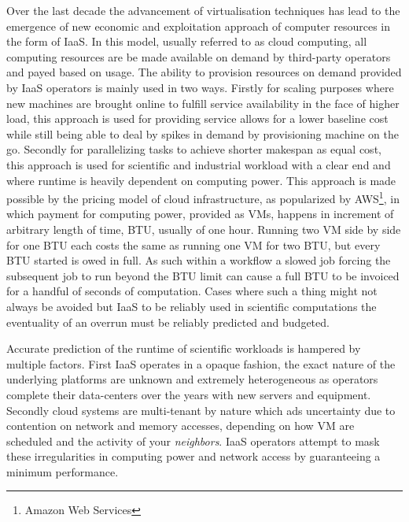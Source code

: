 \documentclass[10pt,conference,compsocconf]{IEEEtran}
\begin{document}
Over the last decade the advancement of virtualisation techniques has lead to the emergence of new economic and exploitation approach of computer resources in the form of \ac{IaaS}. In this model, usually referred to as cloud computing, all computing resources are be made available on demand by third-party operators and payed based on usage. The ability to provision resources on demand provided by \ac{IaaS} operators is mainly used in two ways. Firstly for scaling purposes where new machines are brought online to fulfill service availability in the face of higher load, this approach is used for providing service allows for a lower baseline cost while still being able to deal by spikes in demand by provisioning machine on the go. Secondly for parallelizing tasks to achieve shorter makespan as equal cost, this approach is used for scientific and industrial workload with a clear end and where runtime is heavily dependent on computing power. This approach is made possible by the pricing model of cloud infrastructure, as popularized by AWS\footnote{Amazon Web Services}, in which payment for computing power, provided as \ac{VMs}, happens in increment of arbitrary length of time, \ac{BTU}, usually of one hour. Running two \ac{VM} side by side for one \ac{BTU} each costs the same as running one \ac{VM} for two \ac{BTU}, but every BTU started is owed in full. As such within a workflow a slowed job forcing the subsequent job to run beyond the \ac{BTU} limit can cause a full \ac{BTU} to be invoiced for a handful of seconds of computation. Cases where such a thing might not always be avoided but \ac{IaaS} to be reliably used in scientific computations the eventuality of an overrun must be reliably predicted and budgeted.

Accurate prediction of the runtime of scientific workloads is hampered by multiple factors. First \ac{IaaS} operates in a opaque fashion, the exact nature of the underlying platforms are unknown and extremely heterogeneous as operators complete their data-centers over the years with new servers and equipment. Secondly cloud systems are multi-tenant by nature which ads uncertainty due to contention on network and memory accesses, depending on how \ac{VM} are scheduled and the activity of your \emph{neighbors}. \ac{IaaS} operators attempt to mask these irregularities in computing power and network access by guaranteeing a minimum performance. 
\end{document}
